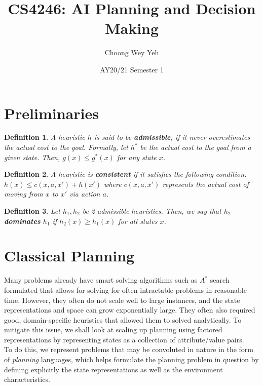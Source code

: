 \documentclass[11pt]{article}
\title{CS4246: AI Planning and Decision Making}
\author{Choong Wey Yeh}
\date{AY20/21 Semester 1}
\newtheorem{definition}{Definition}
\begin{document}
\maketitle

\section{Preliminaries}

\begin{definition}
A heuristic $h$ is said to be \textbf{admissible}, if it never overestimates the actual cost to the goal. Formally, let $h^*$ be the actual cost to the goal from a given state. Then, $g(x) \leq g^*(x)$ for any state $x$.
\end{definition}

\begin{definition}
A heuristic is \textbf{consistent} if it satisfies the following condition: $h(x) \leq c(x, a, x') + h(x')$ where $c(x, a, x')$ represents the actual cost of moving from $x$ to $x'$ via action $a$.
\end{definition}

\begin{definition}
Let $h_1, h_2$ be 2 admissible heuristics. Then, we say that $h_2$ \textbf{dominates} $h_1$ if $h_2(x) \geq h_1(x)$ for all states $x$.
\end{definition}

\section{Classical Planning}

Many problems already have smart solving algorithms such as $A^*$ search formulated that allows for solving for often intractable problems in reasonable time. However, they often do not scale well to large instances, and the state representations and space can grow exponentially large. They often also required good, domain-specific heuristics that allowed them to solved analytically. To mitigate this issue, we shall look at scaling up planning using factored representations by representing states as a collection of attribute/value pairs.\\

To do this, we represent problems that may be convoluted in nature in the form of \textit{planning} languages, which helps formulate the planning problem in question by defining explicitly the state representations as well as the environment characteristics.
\end{document}
